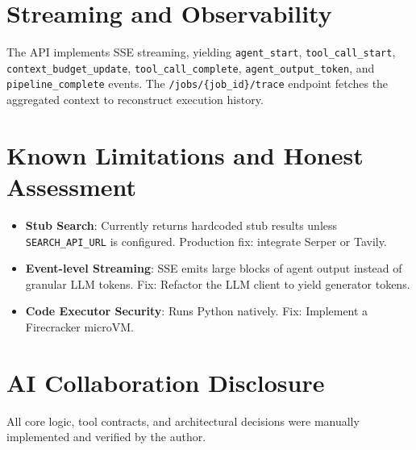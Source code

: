 \documentclass[11pt]{article}
\begin{document}
\section{Streaming and Observability}
The API implements SSE streaming, yielding \texttt{agent\_start}, \texttt{tool\_call\_start}, \texttt{context\_budget\_update}, \texttt{tool\_call\_complete}, \texttt{agent\_output\_token}, and \texttt{pipeline\_complete} events. The \texttt{/jobs/\{job\_id\}/trace} endpoint fetches the aggregated context to reconstruct execution history.

\section{Known Limitations and Honest Assessment}
\begin{itemize}
    \item \textbf{Stub Search}: Currently returns hardcoded stub results unless \texttt{SEARCH\_API\_URL} is configured. Production fix: integrate Serper or Tavily.
    \item \textbf{Event-level Streaming}: SSE emits large blocks of agent output instead of granular LLM tokens. Fix: Refactor the LLM client to yield generator tokens.
    \item \textbf{Code Executor Security}: Runs Python natively. Fix: Implement a Firecracker microVM.
\end{itemize}

\section{AI Collaboration Disclosure}
All core logic, tool contracts, and architectural decisions were manually implemented and verified by the author.
\end{document}
